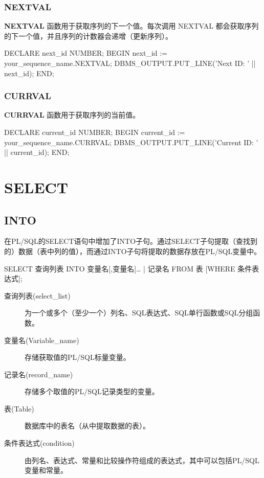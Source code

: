 \documentclass[11pt, a4paper, oneside, UTF8]{ctexbook}
\let\kaishu\relax %
\begin{document}
\subsection{NEXTVAL}
{\bfseries\kaishu NEXTVAL }函数用于获取序列的下一个值。每次调用 NEXTVAL 都会获取序列的下一个值，并且序列的计数器会递增（更新序列）。
\begin{plsql}[caption=NEXTVAL示例代码]
DECLARE
  next_id NUMBER;
BEGIN
  next_id := your_sequence_name.NEXTVAL;
  DBMS_OUTPUT.PUT_LINE('Next ID: ' || next_id);
END;
\end{plsql}
\subsection{CURRVAL}
{\bfseries\kaishu CURRVAL} 函数用于获取序列的当前值。
\begin{plsql}[caption=CURRVAL示例代码]
DECLARE
  current_id NUMBER;
BEGIN
  current_id := your_sequence_name.CURRVAL;
  DBMS_OUTPUT.PUT_LINE('Current ID: ' || current_id);
END;
\end{plsql}
\chapter{SELECT}
\section{INTO}
在PL/SQL的SELECT语句中增加了INTO子句。通过SELECT子句提取（查找到的）数据（表中列的值），而通过INTO子句将提取的数据存放在PL/SQL变量中。

\begin{plsql}[caption=SELECT示例代码]
SELECT 查询列表
INTO {变量名[,变量名]… | 记录名}
FROM 表
[WHERE 条件表达式];
\end{plsql}
\begin{description}
  \item[查询列表(select\_list)] 为一个或多个（至少一个）列名、SQL表达式、SQL单行函数或SQL分组函数。
  \item[变量名(Variable\_name)] 存储获取值的PL/SQL标量变量。
  \item[记录名(record\_name)] 存储多个取值的PL/SQL记录类型的变量。
  \item[表(Table)] 数据库中的表名（从中提取数据的表）。
  \item[条件表达式(condition)] 由列名、表达式、常量和比较操作符组成的表达式，其中可以包括PL/SQL变量和常量。
\end{description}
\end{document}

